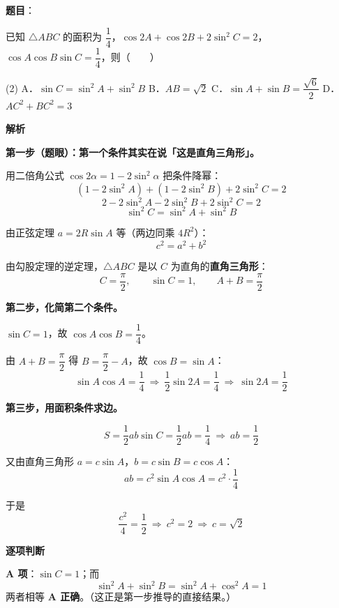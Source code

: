 \begin{answer}

\textbf{题目}：

已知 $\triangle ABC$ 的面积为 $\dfrac14$，$\cos 2A+\cos 2B+2\sin^2 C=2$，$\cos A\cos B\sin C=\dfrac14$，则\mbox{（　　）}

\begin{gkopts}(2)
\task A．$\sin C=\sin^2 A+\sin^2 B$
\task B．$AB=\sqrt2$
\task C．$\sin A+\sin B=\dfrac{\sqrt6}{2}$
\task D．$AC^2+BC^2=3$
\end{gkopts}

\textbf{解析}

\textbf{第一步（题眼）：第一个条件其实在说「这是直角三角形」。}

用二倍角公式 $\cos2\alpha=1-2\sin^2\alpha$ 把条件降幂：
\nopagebreak[4]
\[\left(1-2\sin^2A\right)+\left(1-2\sin^2B\right)+2\sin^2C=2\]
\nopagebreak[4]
\[2-2\sin^2A-2\sin^2B+2\sin^2C=2\]
\nopagebreak[4]
\[\sin^2C=\sin^2A+\sin^2B\]

由正弦定理 $a=2R\sin A$ 等（两边同乘 $4R^2$）：
\nopagebreak[4]
\[c^2=a^2+b^2\]

由勾股定理的逆定理，$\triangle ABC$ 是以 $C$ 为直角的\textbf{直角三角形}：
\nopagebreak[4]
\[C=\frac\pi2,\qquad \sin C=1,\qquad A+B=\frac\pi2\]

\textbf{第二步，化简第二个条件。}

$\sin C=1$，故 $\cos A\cos B=\dfrac14$。

由 $A+B=\dfrac\pi2$ 得 $B=\dfrac\pi2-A$，故 $\cos B=\sin A$：
\nopagebreak[4]
\[\sin A\cos A=\frac14\ \Longrightarrow\ \frac12\sin2A=\frac14\ \Longrightarrow\ \sin2A=\frac12\]

\textbf{第三步，用面积条件求边。}

\nopagebreak[4]
\[S=\frac12ab\sin C=\frac12ab=\frac14\ \Longrightarrow\ ab=\frac12\]

又由直角三角形 $a=c\sin A$，$b=c\sin B=c\cos A$：
\nopagebreak[4]
\[ab=c^2\sin A\cos A=c^2\cdot\frac14\]

于是
\nopagebreak[4]
\[\frac{c^2}{4}=\frac12\ \Longrightarrow\ c^2=2\ \Longrightarrow\ c=\sqrt2\]

\par\medskip

\textbf{逐项判断}

\textbf{A 项}：$\sin C=1$；而
\nopagebreak[4]
\[\sin^2A+\sin^2B=\sin^2A+\cos^2A=1\]
两者相等  \textbf{A 正确}。（这正是第一步推导的直接结果。）


\end{answer}

